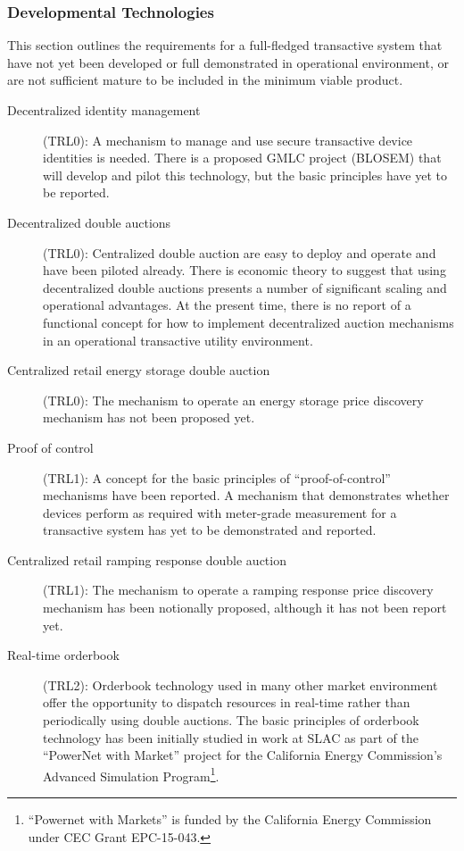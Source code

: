 \documentclass[10pt,twocolumn]{article}
\begin{document}
\subsubsection{Developmental Technologies}

This section outlines the requirements for a full-fledged transactive system that have not yet been developed or full demonstrated in operational environment, or are not sufficient mature to be included in the minimum viable product.

\begin{description}

    \item[Decentralized identity management] (TRL0): A mechanism to manage and use secure transactive device identities is needed.  There is a proposed GMLC project (BLOSEM) that will develop and pilot this technology, but the basic principles have yet to be reported.

    \item[Decentralized double auctions] (TRL0): Centralized double auction are easy to deploy and operate and have been piloted already. There is economic theory to suggest that using decentralized double auctions presents a number of significant scaling and operational advantages. At the present time, there is no report of a functional concept for how to implement decentralized auction mechanisms in an operational transactive utility environment.

    \item[Centralized retail energy storage double auction] (TRL0): The mechanism to operate an energy storage price discovery mechanism has not been proposed yet.

    \item[Proof of control] (TRL1): A concept for the basic principles of ``proof-of-control'' mechanisms have been reported.  A mechanism that demonstrates whether devices perform as required with meter-grade measurement for a transactive system has yet to be demonstrated and reported. 
    
    \item[Centralized retail ramping response double auction] (TRL1): The mechanism to operate a ramping response price discovery mechanism has been notionally proposed, although it has not been report yet.

    \item[Real-time orderbook] (TRL2): Orderbook technology used in many other market environment offer the opportunity to dispatch resources in real-time rather than periodically using double auctions.  The basic principles of orderbook technology has been initially studied in work at SLAC as part of the ``PowerNet with Market'' project for the California Energy Commission's Advanced Simulation Program\footnote{``Powernet with Markets'' is funded by the California Energy Commission under CEC Grant EPC-15-043.}.


\end{description}
\end{document}
